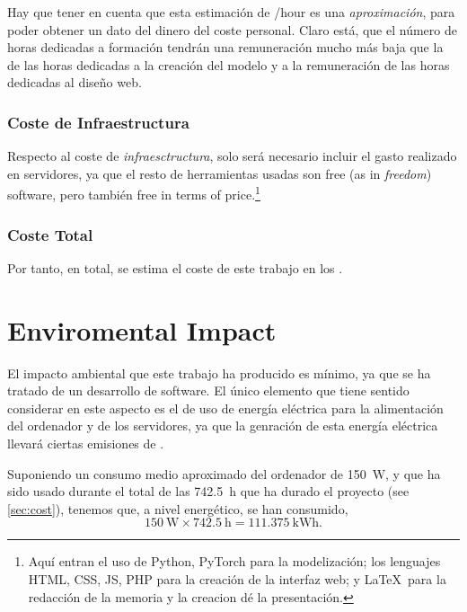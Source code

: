 \begin{remarkBox}
  Hay que tener en cuenta que esta estimación de /hour es una
  \emph{aproximación}, para poder obtener un dato del dinero del coste
  personal. Claro está, que el número de horas dedicadas a formación tendrán
  una remuneración mucho más baja que la de las horas dedicadas a la creación
  del modelo y a la remuneración de las horas dedicadas al diseño web.
\end{remarkBox}

\subsubsection{Coste de Infraestructura}

Respecto al coste de \emph{infraesctructura}, solo será necesario incluir el
gasto realizado en servidores, ya que el resto de herramientas usadas son free
(as in \emph{freedom}) software, pero también free in terms of
price.\footnote{Aquí entran el uso de Python, PyTorch para la modelización; los
  lenguajes HTML, CSS, JS, PHP para la creación de la interfaz web; y \LaTeX\
  para la redacción de la memoria y la creacion dé la presentación.}

\subsubsection{Coste Total}

Por tanto, en total, se estima el coste de este trabajo en los .



\section{Enviromental Impact}\label{sec:enviromental}

El impacto ambiental que este trabajo ha producido es mínimo, ya que se ha
tratado de un desarrollo de software. El único elemento que tiene sentido
considerar en este aspecto es el de uso de energía eléctrica para la
alimentación del ordenador y de los servidores, ya que la genración de esta
energía eléctrica llevará ciertas emisiones de \ch{CO2}.

Suponiendo un consumo medio aproximado del ordenador de \SI{150}{\watt}, y que
ha sido usado durante el total de las \SI{742.5}{\hour} que ha durado el
proyecto (see \vref{sec:cost}), tenemos que, a nivel energético, se han
consumido,
\begin{equation}
  \SI{150}{\watt} \times \SI{742.5}{\hour} = \SI{111.375}{\kWh}.
\end{equation}

